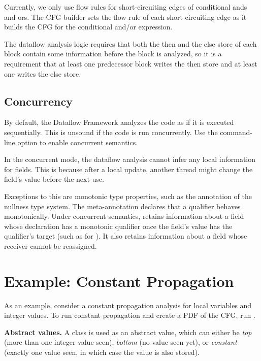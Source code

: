 Currently, we only use flow rules for short-circuiting edges of
conditional ands and ors.  The CFG builder sets the flow rule of each
short-circuiting edge as it builds the CFG for the conditional and/or
expression.

The dataflow analysis logic requires that both the then and the else
store of each block contain some information before the block is
analyzed, so it is a requirement that at least one predecessor block
writes the then store and at least one writes the else store.


\subsection{Concurrency}

By default, the Dataflow Framework analyzes the code as if it is
executed sequentially.  This is unsound if the code is run
concurrently.  Use the  command-line
option to enable concurrent semantics.

In the concurrent mode, the dataflow analysis cannot infer any
local information for fields.  This is because after a local update,
another thread might change the field's value before the next use.

Exceptions to this are monotonic type properties, such as the
 annotation of the nullness type system.  The
meta-annotation  declares that a qualifier
behaves monotonically.  Under concurrent semantics, 
retains information about a field whose declaration has a monotonic
qualifier once the field's value has the qualifier's target (such as
 for ).  It also retains information
about a  field whose receiver cannot be reassigned.


\section{Example: Constant Propagation}

As an example, consider a constant propagation
analysis for local variables and integer values.
To run constant propagation and create a PDF of the CFG, run
.

\textbf{Abstract values.} A class  is used as an
abstract value, which can either be \emph{top} (more than one integer
value seen), \emph{bottom} (no value seen yet), or \emph{constant}
(exactly one value seen, in which case the value is also stored).

